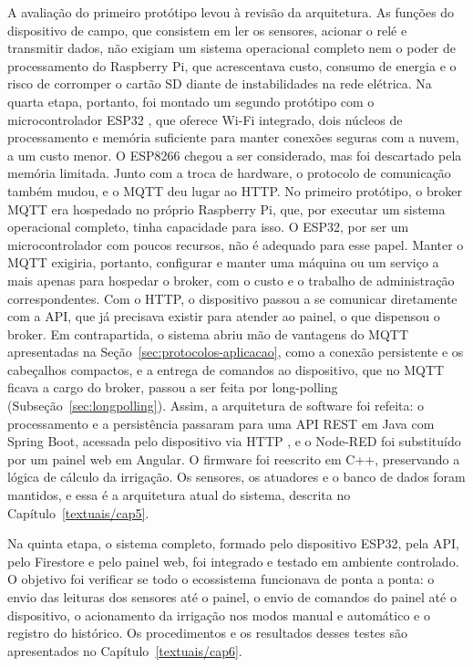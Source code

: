 A avaliação do primeiro protótipo levou à revisão da arquitetura. As funções do dispositivo de campo, que consistem em ler os sensores, acionar o relé e transmitir dados, não exigiam um sistema operacional completo nem o poder de processamento do Raspberry Pi, que acrescentava custo, consumo de energia e o risco de corromper o cartão SD diante de instabilidades na rede elétrica. Na quarta etapa, portanto, foi montado um segundo protótipo com o microcontrolador ESP32 \cite{espressif}, que oferece Wi-Fi integrado, dois núcleos de processamento e memória suficiente para manter conexões seguras com a nuvem, a um custo menor. O ESP8266 chegou a ser considerado, mas foi descartado pela memória limitada. Junto com a troca de hardware, o protocolo de comunicação também mudou, e o MQTT deu lugar ao HTTP. No primeiro protótipo, o broker MQTT era hospedado no próprio Raspberry Pi, que, por executar um sistema operacional completo, tinha capacidade para isso. O ESP32, por ser um microcontrolador com poucos recursos, não é adequado para esse papel. Manter o MQTT exigiria, portanto, configurar e manter uma máquina ou um serviço a mais apenas para hospedar o broker, com o custo e o trabalho de administração correspondentes. Com o HTTP, o dispositivo passou a se comunicar diretamente com a API, que já precisava existir para atender ao painel, o que dispensou o broker. Em contrapartida, o sistema abriu mão de vantagens do MQTT apresentadas na Seção~\ref{sec:protocolos-aplicacao}, como a conexão persistente e os cabeçalhos compactos, e a entrega de comandos ao dispositivo, que no MQTT ficava a cargo do broker, passou a ser feita por long-polling (Subseção~\ref{sec:longpolling}). Assim, a arquitetura de software foi refeita: o processamento e a persistência passaram para uma API REST em Java com Spring Boot, acessada pelo dispositivo via HTTP \cite{rfc9110}, e o Node-RED foi substituído por um painel web em Angular. O firmware foi reescrito em C++, preservando a lógica de cálculo da irrigação. Os sensores, os atuadores e o banco de dados foram mantidos, e essa é a arquitetura atual do sistema, descrita no Capítulo~\ref{textuais/cap5}.
 
Na quinta etapa, o sistema completo, formado pelo dispositivo ESP32, pela API, pelo Firestore e pelo painel web, foi integrado e testado em ambiente controlado. O objetivo foi verificar se todo o ecossistema funcionava de ponta a ponta: o envio das leituras dos sensores até o painel, o envio de comandos do painel até o dispositivo, o acionamento da irrigação nos modos manual e automático e o registro do histórico. Os procedimentos e os resultados desses testes são apresentados no Capítulo~\ref{textuais/cap6}.
 
